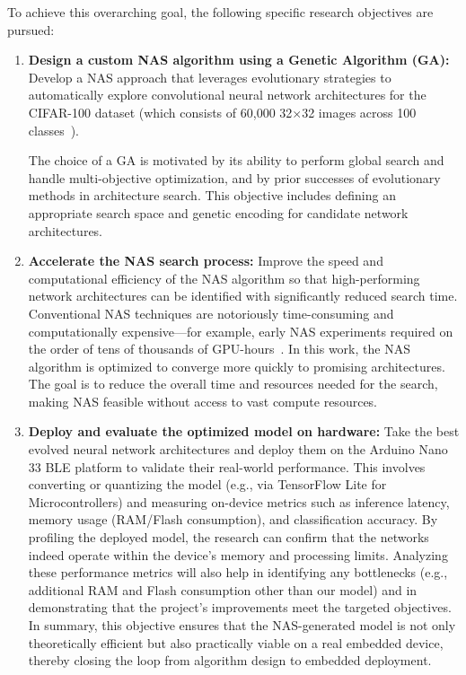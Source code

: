 To achieve this overarching goal, the following specific research objectives are pursued:
 
\begin{enumerate}
    \item \textbf{Design a custom NAS algorithm using a Genetic Algorithm (GA):} Develop a NAS approach that leverages evolutionary strategies to automatically explore convolutional neural network architectures for the CIFAR-100 dataset (which consists of 60,000 32$\times$32 images across 100 classes~\cite{cifar}). 
    
    The choice of a GA is motivated by its ability to perform global search and handle multi-objective optimization, and by prior successes of evolutionary methods in architecture search. This objective includes defining an appropriate search space and genetic encoding for candidate network architectures.

    \item \textbf{Accelerate the NAS search process:} Improve the speed and computational efficiency of the NAS algorithm so that high-performing network architectures can be identified with significantly reduced search time. Conventional NAS techniques are notoriously time-consuming and computationally expensive---for example, early NAS experiments required on the order of tens of thousands of GPU-hours~\cite{pham2018efficient}. In this work, the NAS algorithm is optimized to converge more quickly to promising architectures. The goal is to reduce the overall time and resources needed for the search, making NAS feasible without access to vast compute resources.



    \item \textbf{Deploy and evaluate the optimized model on hardware:} Take the best evolved neural network architectures and deploy them on the Arduino Nano 33 BLE platform to validate their real-world performance. This involves converting or quantizing the model (e.g., via TensorFlow Lite for Microcontrollers) and measuring on-device metrics such as inference latency, memory usage (RAM/Flash consumption), and classification accuracy. By profiling the deployed model, the research can confirm that the networks indeed operate within the device’s memory and processing limits. Analyzing these performance metrics will also help in identifying any bottlenecks (e.g., additional RAM and Flash consumption other than our model) and in demonstrating that the project’s improvements meet the targeted objectives. In summary, this objective ensures that the NAS-generated model is not only theoretically efficient but also practically viable on a real embedded device, thereby closing the loop from algorithm design to embedded deployment.
\end{enumerate}


